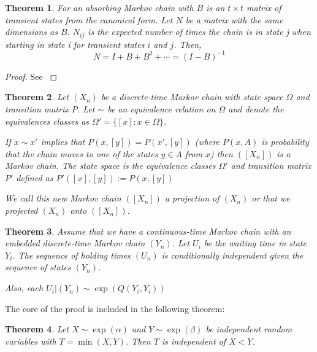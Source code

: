 \documentclass{article}
\theoremstyle{plain}
\newtheorem{theorem}{Theorem}[section]
\theoremstyle{definition}
\theoremstyle{remark}
\numberwithin{equation}{section}
\begin{document}
\begin{theorem} \label{thm:fund_exp} \cite{grinstead2003}
For an absorbing Markov chain with $B$ is an $t \times t$ matrix of transient states from the canonical form. Let $N$ be a matrix with the same dimensions as $B$. $N_{ij}$ is the expected number of times the chain is in state j when starting in state i for transient states $i$ and $j$. Then,
\begin{equation}
    N = I + B + B^2 + \cdots = (I - B)^{-1}
\end{equation}
\end{theorem}

\begin{proof}
See \cite{grinstead2003}
\end{proof}

\begin{theorem}\label{thm:mc_projection} \cite{LevinPeresWilmer2006}
Let $(X_n)$ be a discrete-time Markov chain with state space $\Omega$ and transition matrix $P$.
Let $\sim$ be an equivalence relation on $\Omega$ and denote the equivalences classes as $\Omega' = \{[x]: x \in \Omega\}$.

If $x \sim x'$ implies that $P(x,[y]) = P(x', [y])$ (where $P(x,A)$ is probability that the chain moves to one of the states $y \in A$ from $x$) then $([X_n])$  is a Markov chain.
The state space is the equivalence classes $\Omega'$ and transition matrix $P'$ defined as $P'([x],[y]) := P(x, [y])$

We call this new Markov chain $([X_n])$ a projection of $(X_n)$ or that we projected $(X_n)$ onto $([X_n])$.
\end{theorem}

\begin{theorem}\label{thm:x_N_indep}
Assume that we have a continuous-time Markov chain with an embedded discrete-time Markov chain $(Y_n)$.
Let $U_i$ be the waiting time in state $Y_i$.
The sequence of holding times $(U_n)$ is conditionally independent given the sequence of states $(Y_n)$.

Also, each $U_i | (Y_n) \sim \exp(Q(Y_i,Y_i))$
\end{theorem}

The core of the proof is included in the following theorem:

\begin{theorem}
Let $X \sim \exp(\alpha)$ and $Y \sim \exp(\beta)$ be independent random variables with $T = \min(X,Y)$.
Then $T$ is independent of $X < Y$.
\end{theorem}
\end{document}
